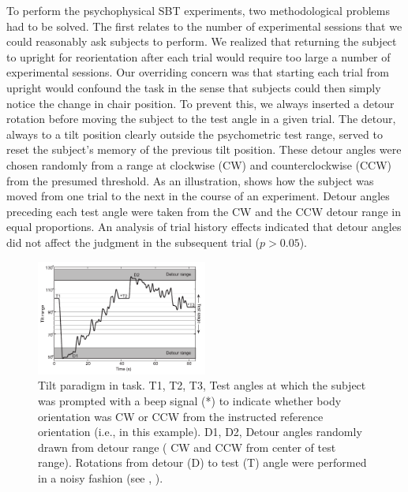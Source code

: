 To perform the psychophysical SBT experiments, two methodological problems had to be solved. The first relates to the number of experimental sessions that we could reasonably ask subjects to perform. We realized that returning the subject to upright for reorientation after each trial would require too large a number of experimental sessions. Our overriding concern was that starting each trial from upright would confound the  task in the sense that subjects could then simply notice the change in chair position. To prevent this, we always inserted a detour rotation before moving the subject to the test angle in a given trial. The detour, always to a tilt position clearly outside the psychometric test range, served to reset the subject's memory of the previous tilt position. These detour angles were chosen randomly from a range at  clockwise (CW) and counterclockwise (CCW) from the presumed threshold. As an illustration,  shows how the subject was moved from one trial to the next in the course of an  experiment. Detour angles preceding each test angle were taken from the CW and the CCW detour range in equal proportions. An analysis of trial history effects indicated that detour angles did not affect the judgment in the subsequent trial ($p > 0.05$). 

\begin{figure}    
    \includegraphics[width=0.5\textwidth]{src/paper1/figure2.pdf}
    
    \caption{Tilt paradigm in  task. T1, T2, T3, Test angles at which the subject was prompted with a beep signal (*) to indicate whether body orientation was CW or CCW from the instructed reference orientation (i.e.,  in this example). D1, D2, Detour angles randomly drawn from detour range ( CW and CCW from center of test range). Rotations from detour (D) to test (T) angle were performed in a noisy fashion (see , ).}
    \label{p1:fig2}
\end{figure}

